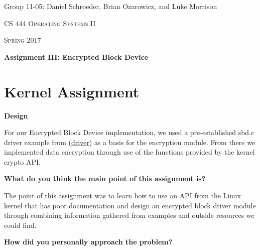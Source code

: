 \documentclass[10pt,letterpaper,draftclsnofoot,onecolumn]{IEEEtran}
\begin{document}
\begin{titlepage}
\centering
{\Large Group 11-05: Daniel Schroeder, Brian Ozarowicz, and Luke Morrison\par}
\vspace{1cm}
{\scshape\Large CS 444 Operating Systems II\par}
{\scshape\Large Spring 2017\par}
\vspace{1cm}
{\huge\bfseries Assignment III: Encrypted Block Device\par}
\vspace{2cm}
\begin{abstract}
This document is a summary of Assignment 3 for CS 444 Operating Systems II at Oregon State University Spring 2017. This document includes the design and implementation of the kernel assignment to implement an Encrypted Block Device, responses to the design and implimenation questions for the kernel and concurrency assignments, and a work log.
\end{abstract}
\end{titlepage}

\section{Kernel Assignment}
\bigskip

\noindent\textbf{Design}
\medskip

\medskip

\noindent For our Encrypted Block Device implementation, we used a pre-established sbd.c driver example from (\href{http://blog.superpat.com/2010/05/04/a-simple-block-driver-for-linux-kernel-2-6-31/}{driver}) as a basis for the encryption module. From there we implemented data encryption through use of the functions provided by the kernel crypto API.

\bigskip

\noindent\textbf{What do you think the main point of this assignment is?}
\medskip

\medskip

\noindent The point of this assignment was to learn how to use an API from the Linux kernel that has poor documentation and design an encrypted block driver module through combining information gathered from examples and outside resources we could find.
\bigskip

\noindent\textbf{How did you personally approach the problem?}
\medskip

\medskip
\end{document}
